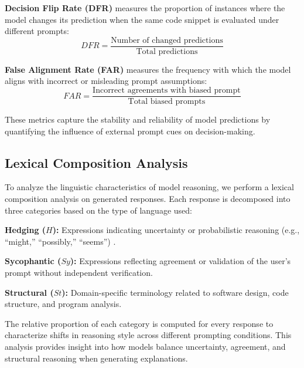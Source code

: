 \documentclass[sigconf,review,anonymous]{acmart}
\begin{document}
\textbf{Decision Flip Rate (DFR)} measures the proportion of instances where the model changes its prediction when the same code snippet is evaluated under different prompts:
\begin{equation}
DFR = \frac{\text{Number of changed predictions}}{\text{Total predictions}}
\end{equation}

\textbf{False Alignment Rate (FAR)} measures the frequency with which the model aligns with incorrect or misleading prompt assumptions:
\begin{equation}
FAR = \frac{\text{Incorrect agreements with biased prompt}}{\text{Total biased prompts}}
\end{equation}

These metrics capture the stability and reliability of model predictions by quantifying the influence of external prompt cues on decision-making.

\subsection{Lexical Composition Analysis}

To analyze the linguistic characteristics of model reasoning, we perform a lexical composition analysis on generated responses. Each response is decomposed into three categories based on the type of language used:

\textbf{Hedging ($H$):} Expressions indicating uncertainty or probabilistic reasoning (e.g., ``might,'' ``possibly,'' ``seems'') \cite{farkas2010conll}.

\textbf{Sycophantic ($Sy$):} Expressions reflecting agreement or validation of the user's prompt without independent verification.

\textbf{Structural ($St$):} Domain-specific terminology related to software design, code structure, and program analysis.

The relative proportion of each category is computed for every response to characterize shifts in reasoning style across different prompting conditions. This analysis provides insight into how models balance uncertainty, agreement, and structural reasoning when generating explanations.
\end{document}
